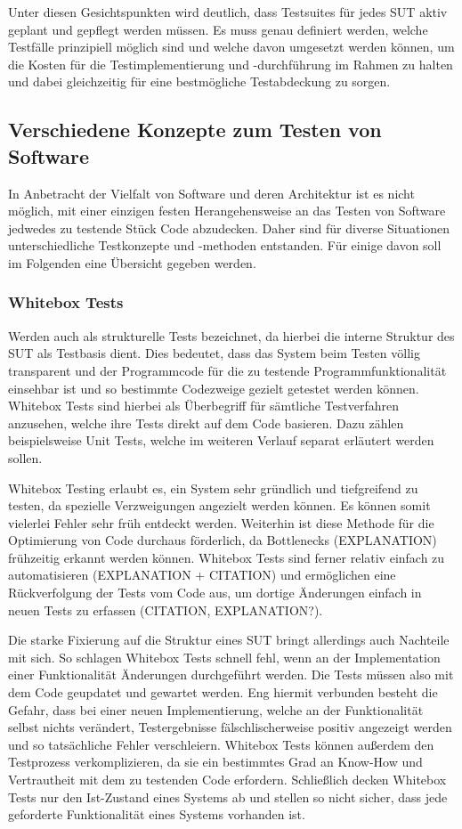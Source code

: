 Unter diesen Gesichtspunkten wird deutlich, dass Testsuites für jedes \ac{SUT} aktiv geplant und gepflegt werden müssen. Es muss genau definiert werden, welche Testfälle prinzipiell möglich sind und welche davon umgesetzt werden können, um die Kosten für die Testimplementierung und -durchführung im Rahmen zu halten und dabei gleichzeitig für eine bestmögliche Testabdeckung zu sorgen.

\subsection{Verschiedene Konzepte zum Testen von Software}\label{subsec:testkonzepte}
In Anbetracht der Vielfalt von Software und deren Architektur ist es nicht möglich, mit einer einzigen festen Herangehensweise an das Testen von Software jedwedes zu testende Stück Code abzudecken. Daher sind für diverse Situationen unterschiedliche Testkonzepte und -methoden entstanden. Für einige davon soll im Folgenden eine Übersicht gegeben werden.

\subsubsection*{Whitebox Tests}\label{subsubsec:whitebox}
Werden auch als strukturelle Tests bezeichnet, da hierbei die interne Struktur des \ac{SUT} als Testbasis dient. Dies bedeutet, dass das System beim Testen völlig transparent und der Programmcode für die zu testende Programmfunktionalität einsehbar ist und so bestimmte Codezweige gezielt getestet werden können. \cite[S. 125f.]{oregan:2019} Whitebox Tests sind hierbei als Überbegriff für sämtliche Testverfahren anzusehen, welche ihre Tests direkt auf dem Code basieren. Dazu zählen beispielsweise Unit Tests, welche im weiteren Verlauf separat erläutert werden sollen. 

Whitebox Testing erlaubt es, ein System sehr gründlich und tiefgreifend zu testen, da spezielle Verzweigungen angezielt werden können. Es können somit vielerlei Fehler sehr früh entdeckt werden. Weiterhin ist diese Methode für die Optimierung von Code durchaus förderlich, da Bottlenecks (EXPLANATION) frühzeitig erkannt werden können. Whitebox Tests sind ferner relativ einfach zu automatisieren (EXPLANATION + CITATION) und ermöglichen eine Rückverfolgung der Tests vom Code aus, um dortige Änderungen einfach in neuen Tests zu erfassen (CITATION, EXPLANATION?).

Die starke Fixierung auf die Struktur eines \ac*{SUT} bringt allerdings auch Nachteile mit sich. So schlagen Whitebox Tests schnell fehl, wenn an der Implementation einer Funktionalität Änderungen durchgeführt werden. Die Tests müssen also mit dem Code geupdatet und gewartet werden. Eng hiermit verbunden besteht die Gefahr, dass bei einer neuen Implementierung, welche an der Funktionalität selbst nichts verändert, Testergebnisse fälschlischerweise positiv angezeigt werden und so tatsächliche Fehler verschleiern. Whitebox Tests können außerdem den Testprozess verkomplizieren, da sie ein bestimmtes Grad an Know-How und Vertrautheit mit dem zu testenden Code erfordern. Schließlich decken Whitebox Tests nur den Ist-Zustand eines Systems ab und stellen so nicht sicher, dass jede geforderte Funktionalität eines Systems vorhanden ist.

